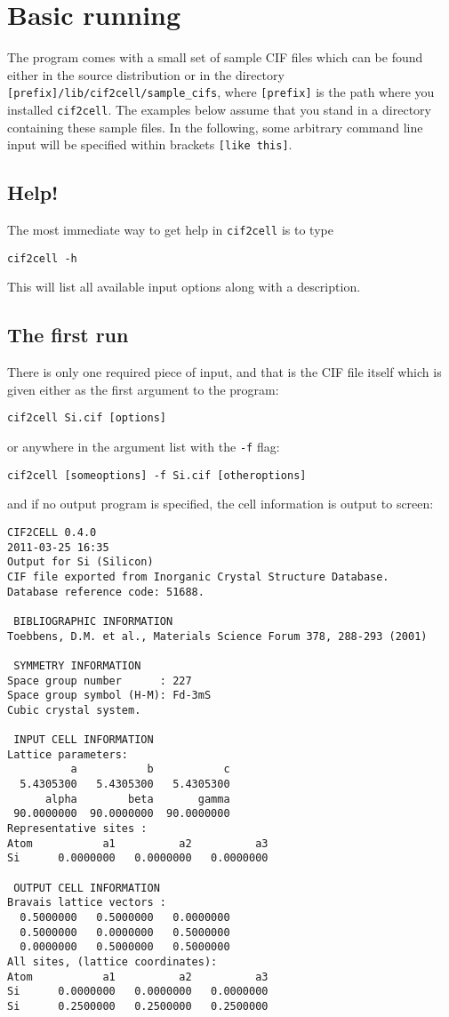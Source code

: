 \documentclass[11pt]{article}
\newcommand{\ciftocell}{\texttt{cif2cell}}
\begin{document}
\section{Basic running}

The program comes with a small set of sample CIF files which can be found either in the source distribution or in the directory \texttt{[prefix]/lib/cif2cell/sample\_cifs}, where \texttt{[prefix]} is the path where you installed \ciftocell. The examples below assume that you stand in a directory containing these sample files. In the following, some arbitrary command line input will be specified within brackets \texttt{[like this]}.

\subsection{Help!}
The most immediate way to get help in \ciftocell{} is to type
\begin{verbatim}
cif2cell -h
\end{verbatim}
This will list all available input options along with a description.

\subsection{The first run}
There is only one required piece of input, and that is the CIF file itself which is given either as the first argument to the program:
\begin{verbatim}
cif2cell Si.cif [options]
\end{verbatim}
or anywhere in the argument list with the \texttt{-f} flag:
\begin{verbatim}
cif2cell [someoptions] -f Si.cif [otheroptions]
\end{verbatim}
and if no output program is specified, the cell information is output to screen:

\newpage
\begin{verbatim}
CIF2CELL 0.4.0
2011-03-25 16:35
Output for Si (Silicon)
CIF file exported from Inorganic Crystal Structure Database.
Database reference code: 51688.

 BIBLIOGRAPHIC INFORMATION
Toebbens, D.M. et al., Materials Science Forum 378, 288-293 (2001) 

 SYMMETRY INFORMATION
Space group number      : 227
Space group symbol (H-M): Fd-3mS
Cubic crystal system.

 INPUT CELL INFORMATION
Lattice parameters:
          a           b           c 
  5.4305300   5.4305300   5.4305300 
      alpha        beta       gamma 
 90.0000000  90.0000000  90.0000000 
Representative sites :
Atom           a1          a2          a3 
Si      0.0000000   0.0000000   0.0000000

 OUTPUT CELL INFORMATION
Bravais lattice vectors :
  0.5000000   0.5000000   0.0000000 
  0.5000000   0.0000000   0.5000000 
  0.0000000   0.5000000   0.5000000 
All sites, (lattice coordinates):
Atom           a1          a2          a3 
Si      0.0000000   0.0000000   0.0000000
Si      0.2500000   0.2500000   0.2500000\end{verbatim}
\end{document}
